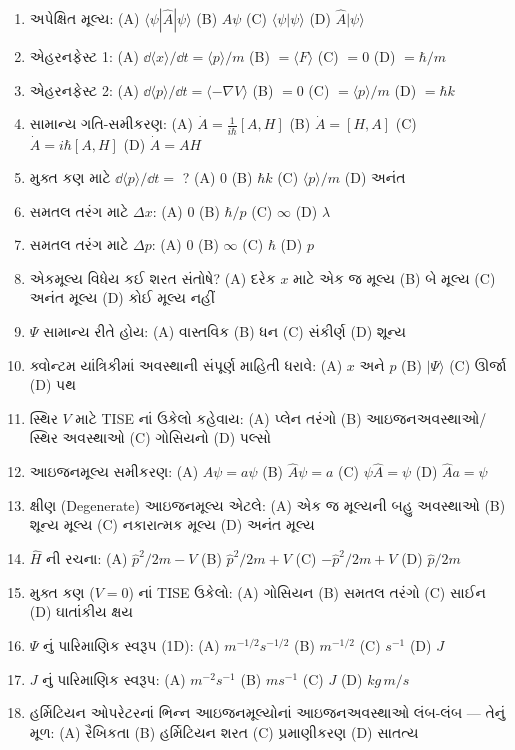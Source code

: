 \begin{enumerate}[label=\textbf{\arabic*.}]
  \item અપેક્ષિત મૂલ્ય: (A) $\langle\psi|\hat A|\psi\rangle$ (B) $\hat A\psi$ (C) $\langle\psi|\psi\rangle$ (D) $\hat A|\psi\rangle$
  \item એહરનફેસ્ટ 1: (A) $\dd\langle x\rangle/\dd t=\langle p\rangle/m$ (B) $=\langle F\rangle$ (C) $=0$ (D) $=\hbar/m$
  \item એહરનફેસ્ટ 2: (A) $\dd\langle p\rangle/\dd t=\langle-\nabla V\rangle$ (B) $=0$ (C) $=\langle p\rangle/m$ (D) $=\hbar k$
  \item સામાન્ય ગતિ-સમીકરણ: (A) $\dot A=\frac{1}{i\hbar}[A,H]$ (B) $\dot A=[H,A]$ (C) $\dot A=i\hbar[A,H]$ (D) $\dot A=AH$
  \item મુક્ત કણ માટે $\dd\langle p\rangle/\dd t=$ ? (A) $0$ (B) $\hbar k$ (C) $\langle p\rangle/m$ (D) અનંત
  \item સમતલ તરંગ માટે $\Delta x$: (A) $0$ (B) $\hbar/p$ (C) $\infty$ (D) $\lambda$
  \item સમતલ તરંગ માટે $\Delta p$: (A) $0$ (B) $\infty$ (C) $\hbar$ (D) $p$
  \item એકમૂલ્ય વિધેય કઈ શરત સંતોષે? (A) દરેક $x$ માટે એક જ મૂલ્ય (B) બે મૂલ્ય (C) અનંત મૂલ્ય (D) કોઈ મૂલ્ય નહીં
  \item $\Psi$ સામાન્ય રીતે હોય: (A) વાસ્તવિક (B) ધન (C) સંકીર્ણ (D) શૂન્ય
  \item ક્વોન્ટમ યાંત્રિકીમાં અવસ્થાની સંપૂર્ણ માહિતી ધરાવે: (A) $x$ અને $p$ (B) $|\Psi\rangle$ (C) ઊર્જા (D) પથ
  \item સ્થિર $V$ માટે TISE નાં ઉકેલો કહેવાય: (A) પ્લેન તરંગો (B) આઇજનઅવસ્થાઓ/સ્થિર અવસ્થાઓ (C) ગોસિયનો (D) પલ્સો
  \item આઇજનમૂલ્ય સમીકરણ: (A) $\hat A\psi=a\psi$ (B) $\hat A\psi=a$ (C) $\psi\hat A=\psi$ (D) $\hat A a=\psi$
  \item ક્ષીણ (Degenerate) આઇજનમૂલ્ય એટલે: (A) એક જ મૂલ્યની બહુ અવસ્થાઓ (B) શૂન્ય મૂલ્ય (C) નકારાત્મક મૂલ્ય (D) અનંત મૂલ્ય
  \item $\hat H$ ની રચના: (A) $\hat p^{2}/2m-V$ (B) $\hat p^{2}/2m+V$ (C) $-\hat p^{2}/2m+V$ (D) $\hat p/2m$
  \item મુક્ત કણ ($V=0$) નાં TISE ઉકેલો: (A) ગોસિયન (B) સમતલ તરંગો (C) સાઈન (D) ઘાતાંકીય ક્ષય
  \item $\Psi$ નું પારિમાણિક સ્વરૂપ (1D): (A) $m^{-1/2}s^{-1/2}$ (B) $m^{-1/2}$ (C) $s^{-1}$ (D) $J$
  \item $J$ નું પારિમાણિક સ્વરૂપ: (A) $m^{-2}s^{-1}$ (B) $ms^{-1}$ (C) $J$ (D) $kg\,m/s$
  \item હર્મિટિયન ઓપરેટરનાં ભિન્ન આઇજનમૂલ્યોનાં આઇજનઅવસ્થાઓ લંબ-લંબ — તેનું મૂળ: (A) રૈખિકતા (B) હર્મિટિયન શરત (C) પ્રમાણીકરણ (D) સાતત્ય

\end{enumerate}
